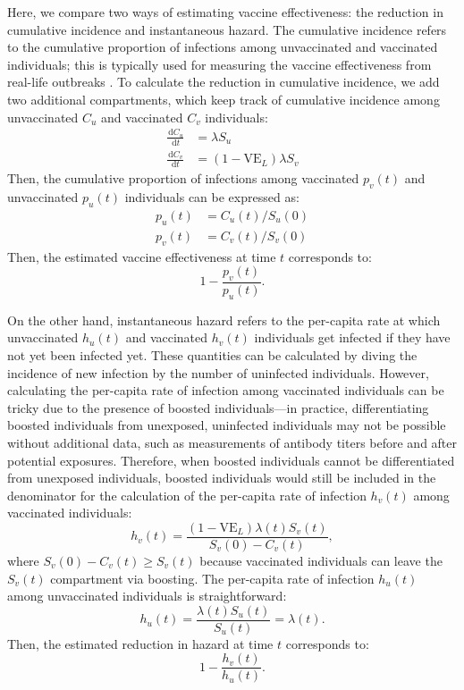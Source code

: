 \documentclass[12pt]{article}
\newcommand{\dd}[1]{\ensuremath{\, \mathrm{d}#1}}
\newcommand{\VE}{\ensuremath{\textrm{VE}}}
\begin{document}
Here, we compare two ways of estimating vaccine effectiveness: the reduction in cumulative incidence and instantaneous hazard.
The cumulative incidence refers to the cumulative proportion of infections among unvaccinated and vaccinated individuals; 
this is typically used for measuring the vaccine effectiveness from real-life outbreaks \citep{farrington1993estimation}.
To calculate the reduction in cumulative incidence, we add two additional compartments, which keep track of cumulative incidence among unvaccinated $C_u$ and vaccinated $C_v$ individuals:
\begin{align}
\frac{\dd C_u}{\dd t} &= \lambda S_u\\
\frac{\dd C_v}{\dd t} &= (1-\VE_L) \lambda S_v
\end{align}
Then, the cumulative proportion of infections among vaccinated $p_v(t)$ and unvaccinated $p_u(t)$ individuals can be expressed as:
\begin{align}
p_u(t) &= C_u(t)/S_u(0)\\
p_v(t) &= C_v(t)/S_v(0)
\end{align}
Then, the estimated vaccine effectiveness at time $t$ corresponds to:
\begin{equation}
1 - \frac{p_v(t)}{p_u(t)}.
\end{equation}

On the other hand, instantaneous hazard refers to the per-capita rate at which unvaccinated $h_u(t)$ and vaccinated $h_v(t)$ individuals get infected if they have not yet been infected yet.
These quantities can be calculated by diving the incidence of new infection by the number of uninfected individuals.
However, calculating the per-capita rate of infection among vaccinated individuals can be tricky due to the presence of boosted individuals---in practice, differentiating boosted individuals from unexposed, uninfected individuals may not be possible without additional data, such as measurements of antibody titers before and after potential exposures.
Therefore, when boosted individuals cannot be differentiated from unexposed individuals, boosted individuals would still be included in the denominator for the calculation of the per-capita rate of infection $h_v(t)$ among vaccinated individuals:
\begin{equation}
h_v(t) = \frac{(1-\VE_L) \lambda(t) S_v(t)}{S_v(0) - C_v(t)},
\end{equation}
where $S_v(0) - C_v(t) \geq S_v(t)$ because vaccinated individuals can leave the $S_v(t)$ compartment via boosting.
The per-capita rate of infection $h_u(t)$ among unvaccinated individuals is straightforward: 
\begin{equation}
h_u(t) = \frac{\lambda(t) S_u(t)}{S_u(t)} = \lambda(t).
\end{equation}
Then, the estimated reduction in hazard at time $t$ corresponds to:
\begin{equation}
1 - \frac{h_v(t)}{h_u(t)}.
\end{equation}
\end{document}
